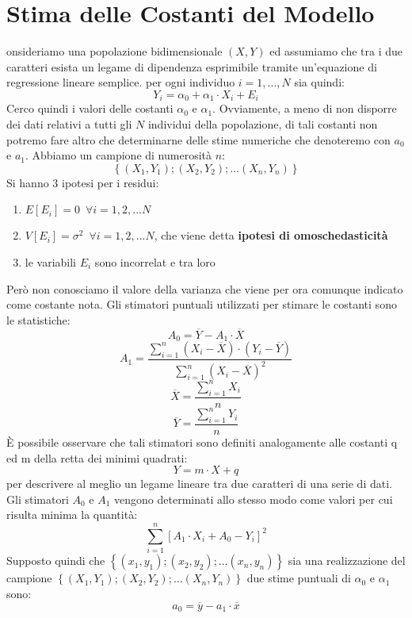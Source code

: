 \documentclass[a4paper,12pt, oneside]{book}
\begin{document}
\section{Stima delle Costanti del Modello}
onsideriamo una popolazione bidimensionale $(X,Y)$ ed assumiamo che tra i due
caratteri esista un legame di dipendenza esprimibile tramite un'equazione di
regressione lineare semplice. per ogni individuo $i=1,...,N$ sia quindi:
\[Y_{i}=\alpha_{0}+\alpha_{1} \cdot X_{i}+E_{i}\]
Cerco quindi i valori delle costanti $\alpha_0$ e $\alpha_1$. Ovviamente, a meno di non disporre dei dati relativi a tutti gli $N$ individui della
popolazione, di tali costanti non potremo fare altro che determinarne delle stime
numeriche che denoteremo con $a_0$ e $a_1$. Abbiamo un campione di numerosità $n$:
\[\left\{\left(X_{1}, Y_{1}\right) ;\left(X_{2}, Y_{2}\right) ; \ldots\left(X_{n}, Y_{n}\right)\right\}\]
Si hanno 3 ipotesi per i residui:
\begin{enumerate}
\item $E[E_i]=0\,\,\,\forall i=1,2,...N$
\item $V[E_i]=\sigma^2\,\,\,\forall i=1,2,...N$, che viene detta \textbf{ipotesi di omoschedasticità}
\item le variabili $E_i$ sono incorrelat e tra loro
\end{enumerate}
Però non conosciamo il valore della varianza che viene per ora comunque indicato come costante nota.
Gli stimatori puntuali utilizzati per stimare le costanti sono le statistiche:
\[A_{0}=\overline{Y}-A_{1} \cdot \overline{X}\]
\[A_{1}=\frac{\sum_{i=1}^{n}\left(X_{i}-\overline{X}\right) \cdot\left(Y_{i}-\overline{Y}\right)}{\sum_{i=1}^{n}\left(X_{i}-\overline{X}\right)^{2}}\]
\[\overline{X}=\frac{\sum_{i=1}^{n} X_{i}}{n}\]
\[\overline{Y}=\frac{\sum_{i=1}^{n} Y_{i}}{n}\]
È possibile osservare che tali stimatori sono definiti analogamente alle costanti q ed
m della retta dei minimi quadrati:
\[Y=m \cdot X+q\]
per descrivere al meglio un legame lineare tra due caratteri di una serie di dati.\\
Gli stimatori $A_0$ e $A_1$ vengono determinati allo stesso modo come valori per
cui risulta minima la quantità:
\[\sum_{i=1}^{n}\left[A_{1} \cdot X_{i}+A_{0}-Y_{i}\right]^{2}\]
Supposto quindi che $\left\{\left(x_{1}, y_{1}\right) ;\left(x_{2}, y_{2}\right) ; \ldots\left(x_{n}, y_{n}\right)\right\}$ sia una realizzazione del campione $\left\{\left(X_{1}, Y_{1}\right) ;\left(X_{2}, Y_{2}\right) ; \ldots\left(X_{n}, Y_{n}\right)\right\}$ due stime puntuali di $\alpha_0$ e $\alpha_1$ sono:
\[a_{0}=\overline{y}-a_{1} \cdot \overline{x}\]
\end{document}
